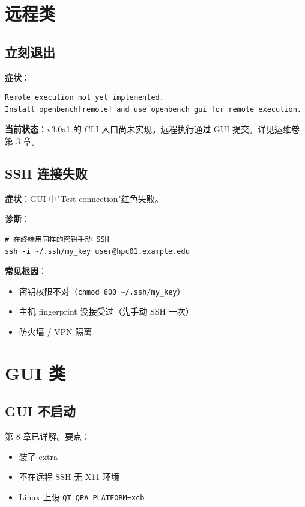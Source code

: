 \section{远程类}

\subsection{ 立刻退出}

\textbf{症状}：

\begin{verbatim}
Remote execution not yet implemented.
Install openbench[remote] and use openbench gui for remote execution.
\end{verbatim}

\textbf{当前状态}：v3.0a1 的  CLI 入口尚未实现。远程执行通过 GUI 提交。详见运维卷第 3 章。

\subsection{SSH 连接失败}

\textbf{症状}：GUI 中"Test connection"红色失败。

\textbf{诊断}：

\begin{verbatim}
# 在终端用同样的密钥手动 SSH
ssh -i ~/.ssh/my_key user@hpc01.example.edu
\end{verbatim}

\textbf{常见根因}：

\begin{itemize}
  \item 密钥权限不对（\texttt{chmod 600 \textasciitilde/.ssh/my\_key}）
  \item 主机 fingerprint 没接受过（先手动 SSH 一次）
  \item 防火墙 / VPN 隔离
\end{itemize}

\section{GUI 类}

\subsection{GUI 不启动}

第 8 章已详解。要点：

\begin{itemize}
  \item 装了 \cli{[gui]} extra
  \item 不在远程 SSH 无 X11 环境
  \item Linux 上设 \texttt{QT\_QPA\_PLATFORM=xcb}
\end{itemize}

